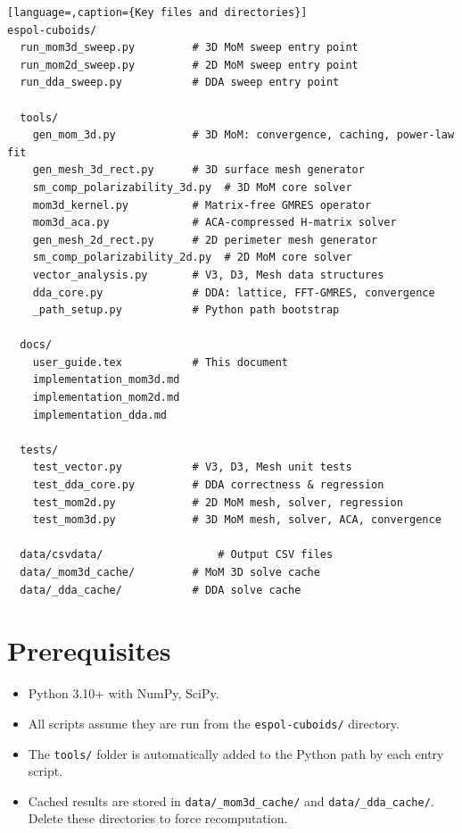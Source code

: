 \documentclass[a4paper,11pt]{article}
\begin{document}
\begin{lstlisting}[language=,caption={Key files and directories}]
espol-cuboids/
  run_mom3d_sweep.py         # 3D MoM sweep entry point
  run_mom2d_sweep.py         # 2D MoM sweep entry point
  run_dda_sweep.py           # DDA sweep entry point

  tools/
    gen_mom_3d.py            # 3D MoM: convergence, caching, power-law fit
    gen_mesh_3d_rect.py      # 3D surface mesh generator
    sm_comp_polarizability_3d.py  # 3D MoM core solver
    mom3d_kernel.py          # Matrix-free GMRES operator
    mom3d_aca.py             # ACA-compressed H-matrix solver
    gen_mesh_2d_rect.py      # 2D perimeter mesh generator
    sm_comp_polarizability_2d.py  # 2D MoM core solver
    vector_analysis.py       # V3, D3, Mesh data structures
    dda_core.py              # DDA: lattice, FFT-GMRES, convergence
    _path_setup.py           # Python path bootstrap

  docs/
    user_guide.tex           # This document
    implementation_mom3d.md
    implementation_mom2d.md
    implementation_dda.md

  tests/
    test_vector.py           # V3, D3, Mesh unit tests
    test_dda_core.py         # DDA correctness & regression
    test_mom2d.py            # 2D MoM mesh, solver, regression
    test_mom3d.py            # 3D MoM mesh, solver, ACA, convergence

  data/csvdata/                  # Output CSV files
  data/_mom3d_cache/         # MoM 3D solve cache
  data/_dda_cache/           # DDA solve cache
\end{lstlisting}

\section{Prerequisites}

\begin{itemize}
    \item Python 3.10+ with NumPy, SciPy.
    \item All scripts assume they are run from the \texttt{espol-cuboids/} directory.
    \item The \texttt{tools/} folder is automatically added to the Python
          path by each entry script.
    \item Cached results are stored in \texttt{data/\_mom3d\_cache/} and
          \texttt{data/\_dda\_cache/}.  Delete these directories to force
          recomputation.
\end{itemize}
\end{document}
